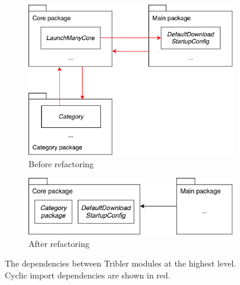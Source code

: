 \begin{figure}[h!]
	\centering
	\begin{subfigure}{.5\textwidth}
		\centering
		\includegraphics[width=0.9\linewidth]{images/improving_qa/cycle_tribler_package}
		\caption{Before refactoring}
		\label{fig:tribler-packages-refactoring-before}
	\end{subfigure}%
	\begin{subfigure}{.5\textwidth}
		\centering
		\includegraphics[width=0.9\linewidth]{images/improving_qa/cycle_tribler_package_after}
		\caption{After refactoring}
		\label{fig:tribler-packages-refactoring-after}
	\end{subfigure}
	\caption{The dependencies between Tribler modules at the highest level. Cyclic import dependencies are shown in red.}
	\label{fig:tribler-packages-refactor}
\end{figure}

